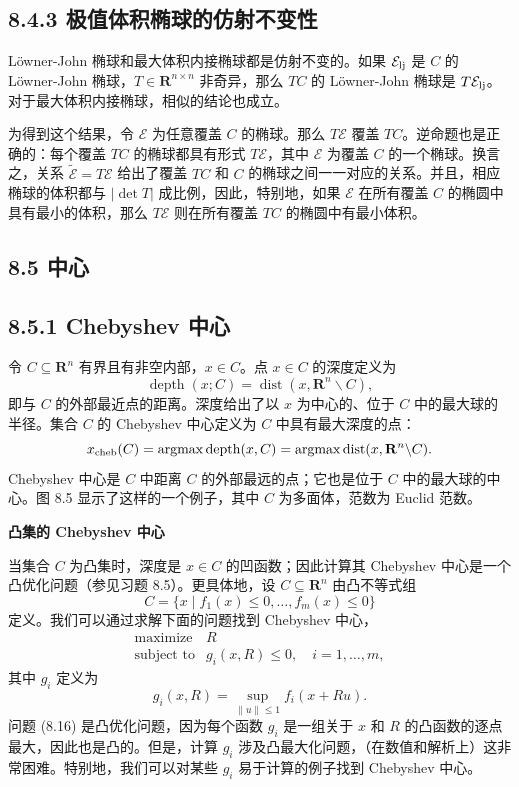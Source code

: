 \documentclass[UTF8,12pt,a4paper,fontset=fandol]{ctexart}
\begin{document}
\subsection*{8.4.3 极值体积椭球的仿射不变性}

Löwner-John 椭球和最大体积内接椭球都是仿射不变的。如果 $\mathcal{E}_{\rm lj}$ 是 $C$ 的 Löwner-John 椭球，$T\in\mathbf{R}^{n\times n}$ 非奇异，那么 $TC$ 的 Löwner-John 椭球是 $T\mathcal{E}_{\rm lj}$。对于最大体积内接椭球，相似的结论也成立。

为得到这个结果，令 $\mathcal{E}$ 为任意覆盖 $C$ 的椭球。那么 $T\mathcal{E}$ 覆盖 $TC$。逆命题也是正确的：每个覆盖 $TC$ 的椭球都具有形式 $T\mathcal{E}$，其中 $\mathcal{E}$ 为覆盖 $C$ 的一个椭球。换言之，关系 $\tilde{\mathcal{E}}=T\mathcal{E}$ 给出了覆盖 $TC$ 和 $C$ 的椭球之间一一对应的关系。并且，相应椭球的体积都与 $|\det T|$ 成比例，因此，特别地，如果 $\mathcal{E}$ 在所有覆盖 $C$ 的椭圆中具有最小的体积，那么 $T\mathcal{E}$ 则在所有覆盖 $TC$ 的椭圆中有最小体积。

\subsection*{8.5 中心}

\subsection*{8.5.1 Chebyshev 中心}

令 $C\subseteq\mathbf{R}^n$ 有界且有非空内部，$x\in C$。点 $x\in C$ 的深度定义为
\[
\operatorname{depth}(x;C)=\operatorname{dist}(x,\mathbf{R}^n\backslash C),
\]
即与 $C$ 的外部最近点的距离。深度给出了以 $x$ 为中心的、位于 $C$ 中的最大球的半径。集合 $C$ 的 Chebyshev 中心定义为 $C$ 中具有最大深度的点：
\[
x_{\rm cheb}(C)=\mathop{\rm argmax}\operatorname{depth}(x,C)
=\mathop{\rm argmax}\operatorname{dist}(x,\mathbf{R}^n\backslash C).
\]
Chebyshev 中心是 $C$ 中距离 $C$ 的外部最远的点；它也是位于 $C$ 中的最大球的中心。图 8.5 显示了这样的一个例子，其中 $C$ 为多面体，范数为 Euclid 范数。

\noindent\textbf{凸集的 Chebyshev 中心}

当集合 $C$ 为凸集时，深度是 $x\in C$ 的凹函数；因此计算其 Chebyshev 中心是一个凸优化问题（参见习题 8.5）。更具体地，设 $C\subseteq\mathbf{R}^n$ 由凸不等式组
\[
C=\{x\mid f_1(x)\leq 0,\ldots,f_m(x)\leq 0\}
\]
定义。我们可以通过求解下面的问题找到 Chebyshev 中心，
\[
\begin{array}{ll}
\mbox{maximize} & R\\
\mbox{subject to} & g_i(x,R)\leq 0,\quad i=1,\ldots,m,
\end{array}
\tag{8.16}
\]
其中 $g_i$ 定义为
\[
g_i(x,R)=\sup_{\|u\|\leq 1} f_i(x+Ru).
\]
问题 (8.16) 是凸优化问题，因为每个函数 $g_i$ 是一组关于 $x$ 和 $R$ 的凸函数的逐点最大，因此也是凸的。但是，计算 $g_i$ 涉及凸最大化问题，（在数值和解析上）这非常困难。特别地，我们可以对某些 $g_i$ 易于计算的例子找到 Chebyshev 中心。
\end{document}
